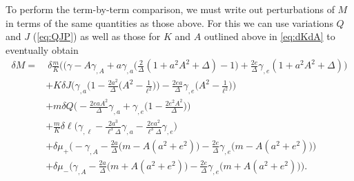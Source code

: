 \documentclass[
twoside,openright,frontopenright]{dmathesis}
\newcommand{\nn}{\nonumber}
\begin{document}
To perform the term-by-term comparison, we must write out perturbations of $M$
in terms of the same quantities as those above. For this we can use variations
$Q$ and $J$ (\cref{eq:QJP}) as well as those for $K$ and $A$ outlined above in
\cref{eq:dKdA} to eventually obtain 
\begin{align}
\delta M = &~\delta\frac{m}{K}\bigg((\gamma-A\gamma_{,A}+a\gamma_{,a}\Big(\frac{2}{\Delta}(1+a^2A^2+\Delta)-1\Big)+\frac{2e}{\Delta}\gamma_{,e}(1+a^2A^2+\Delta)\bigg) \nn\\
&+K\delta J\bigg(\gamma_{,a}\Big(1-\frac{2a^2}{\Delta}\Big(A^2-\frac{1}{\ell^2}\Big)\Big)-\frac{2ea}{\Delta}\gamma_{,e}\Big(A^2-\frac{1}{\ell^2}\Big)\bigg) \nn\\
&+m\delta Q\bigg(-\frac{2eaA^2}{\Delta}\gamma_{,a}+\gamma_{,e}\Big(1-\frac{2e^2A^2}{\Delta}\Big)\bigg) \nn\\
&+\frac{m}{K}\delta\ell\Big(\gamma_{,\ell}-\frac{2a^3}{\ell^3\Delta}\gamma_{,a}-\frac{2ea^2}{\ell^3\Delta}\gamma_{,e}\Big) \nn\\
&+\delta \mu_+\Big( -\gamma_{,A}-\frac{2a}{\Delta}\big(m-A(a^2+e^2)\big)-\frac{2e}{\Delta}\gamma_{,e}\big(m-A(a^2+e^2)\big)\Big) \nn\\
&+\delta \mu_-\Big( \gamma_{,A}-\frac{2a}{\Delta}\big(m+A(a^2+e^2)\big)-\frac{2e}{\Delta}\gamma_{,e}\big(m+A(a^2+e^2)\big)\Big).
\label{eq:dM2}
\end{align}
\end{document}
